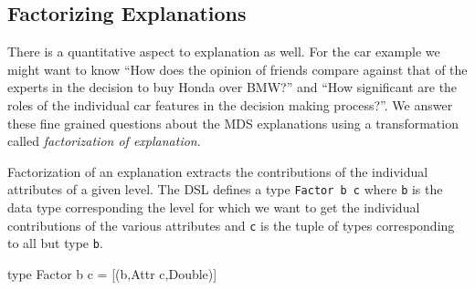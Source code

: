 \documentclass{jfp}
\newcommand{\prog}[1]{\texttt{#1}}
\begin{document}
\subsection{Factorizing Explanations}
There is a quantitative aspect to explanation as well. For the car example we might want to know ``How does the opinion of friends compare against that of the experts in the decision to buy Honda over BMW?'' and  ``How significant are the roles of the individual car features in the decision making process?''. We answer these fine grained questions about the MDS explanations using a transformation called \emph{factorization of explanation}. 

Factorization of an explanation extracts the contributions of the individual attributes of a given level. The DSL defines a type \prog{Factor b c} where \prog{b} is the data type corresponding the level for which we want to get the individual contributions of the various attributes and \prog{c} is the tuple of types corresponding to all but type \prog{b}. 
\begin{haskellcode}
type Factor b c = [(b,Attr c,Double)]
\end{haskellcode}
\end{document}
